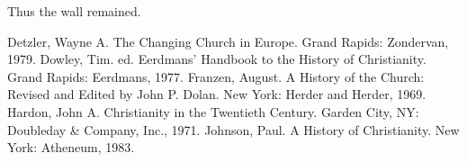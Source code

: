Thus the wall remained.

\begin{readinglist}
\entry Detzler, Wayne A. The Changing Church in Europe. Grand Rapids: Zondervan, 1979.
\entry Dowley, Tim. ed. Eerdmans’ Handbook to the History of Christianity. Grand Rapids: Eerdmans,
  1977.
\entry Franzen, August. A History of the Church: Revised and Edited by John P. Dolan. New York:
  Herder and Herder, 1969.
\entry Hardon, John A. Christianity in the Twentieth Century. Garden City, NY: Doubleday \& Company,
  Inc., 1971.
\entry Johnson, Paul. A History of Christianity. New York: Atheneum, 1983.
\end{readinglist}
